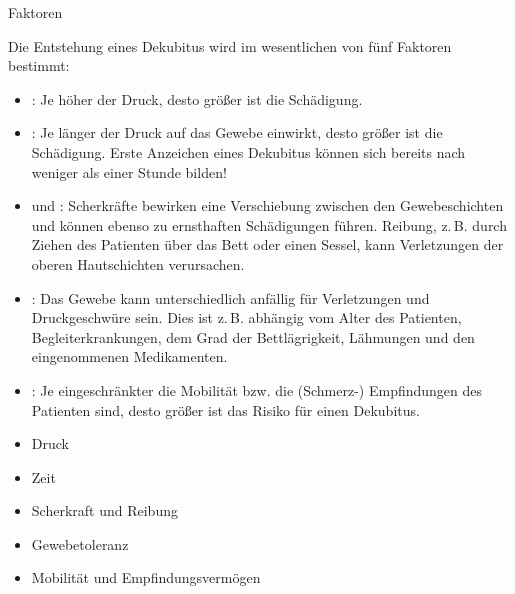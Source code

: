 \TextSlide
{Faktoren}
{Die Entstehung eines Dekubitus wird im wesentlichen von fünf
Faktoren bestimmt:


\begin{itemize}
  \item {}: Je höher der Druck, desto größer ist die
  Schädigung.
  \item {}: Je länger der Druck auf das Gewebe
  einwirkt, desto größer ist die Schädigung. Erste
  Anzeichen eines Dekubitus können sich bereits nach
  weniger als einer Stunde bilden!
  \item {} und : Scherkräfte bewirken eine
  Verschiebung zwischen den Gewebeschichten und können
  ebenso zu ernsthaften Schädigungen führen. Reibung, z.\,B.
  durch Ziehen des Patienten über das Bett oder einen Sessel, kann Verletzungen der
  oberen Hautschichten verursachen.
  \item {}: Das Gewebe kann unterschiedlich
  anfällig für Verletzungen und Druckgeschwüre sein. Dies
  ist z.\,B. abhängig vom Alter des Patienten,
  Begleiterkrankungen, dem Grad der Bettlägrigkeit,
  Lähmungen und den eingenommenen Medikamenten.
  \item {}: Je
  eingeschränkter die Mobilität bzw. die (Schmerz-) Empfindungen des Patienten
  sind, desto größer ist das Risiko für einen Dekubitus.
\end{itemize}}
{\begin{itemize}
  \item {Druck}
  \item {Zeit}
  \item {Scherkraft} und {Reibung}
  \item {Gewebetoleranz}
  \item {Mobilität und Empfindungsvermögen}
\end{itemize}}
{}
{}
{}


